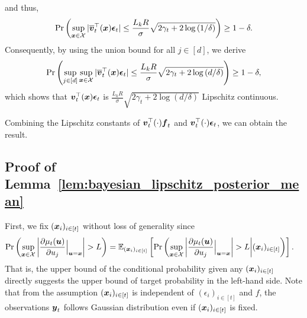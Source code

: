 and thus,
\begin{align*}
    \Pr \left( \sup_{\boldsymbol{x} \in {\cal X}} |\overline{\boldsymbol{v}}_t^\top (\boldsymbol{x}) \boldsymbol{\epsilon}_t| \leq \frac{L_k R}{\sigma} \sqrt{ 2 \gamma_t + 2 \log \left( 1 / \delta \right)} \right) \geq 1 - \delta.
\end{align*}
%
Consequently, by using the union bound for all $j \in [d]$, we derive
\begin{align*}
    \Pr \left( \sup_{j \in [d]} \sup_{\boldsymbol{x} \in {\cal X}} |\overline{\boldsymbol{v}}_t^\top (\boldsymbol{x}) \boldsymbol{\epsilon}_t| \leq \frac{L_k R}{\sigma} \sqrt{ 2 \gamma_t + 2 \log \left( d / \delta \right)} \right) \geq 1 - \delta,
\end{align*}
which shows that $\boldsymbol{v}_t^\top (\boldsymbol{x}) \boldsymbol{\epsilon}_t$ is $\frac{L_k R}{\sigma} \sqrt{ 2 \gamma_t + 2 \log \left( d / \delta \right)}$ Lipschitz continuous.


Combining the Lipschitz constants of $\boldsymbol{v}_t^\top (\cdot) \boldsymbol{f}_t$ and $\boldsymbol{v}_t^\top (\cdot) \boldsymbol{\epsilon}_t$, we can obtain the result.



\subsection{Proof of Lemma~\ref{lem:bayesian_lipschitz_posterior_mean}}
\label{sec:proof_bayesian_lipschitz_posterior_mean}

First, we fix $(\boldsymbol{x}_i)_{i \in [t]}$ without loss of generality since
\begin{align*}
    \Pr \left( \sup_{\boldsymbol{x} \in {\cal X}} \left| \frac{\partial \mu_t(\boldsymbol{u})}{\partial u_j} \Big|_{\boldsymbol{u} = \boldsymbol{x}} \right| > L \right)
    &= \mathbb{E}_{(\boldsymbol{x}_i)_{i \in [t]}} \left[ \Pr \left( \sup_{\boldsymbol{x} \in {\cal X}} \left| \frac{\partial \mu_t(\boldsymbol{u})}{\partial u_j} \Big|_{\boldsymbol{u} = \boldsymbol{x}} \right| > L \bigg| (\boldsymbol{x}_i)_{i \in [t]} \right) \right].
\end{align*}
%
That is, the upper bound of the conditional probability given any $(\boldsymbol{x}_i)_{i \in [t]}$ directly suggests the upper bound of target probability in the left-hand side.
%
Note that from the assumption $(\boldsymbol{x}_i)_{i \in [t]}$ is independent of $(\epsilon_i)_{i \in [t]}$ and $f$, the observations $\boldsymbol{y}_t$ follows Gaussian distribution even if $(\boldsymbol{x}_i)_{i \in [t]}$ is fixed.


